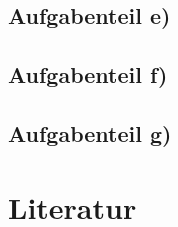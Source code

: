         \subsection{Aufgabenteil e)}


        \subsection{Aufgabenteil f)}


        \subsection{Aufgabenteil g)}

    \section{Literatur}
